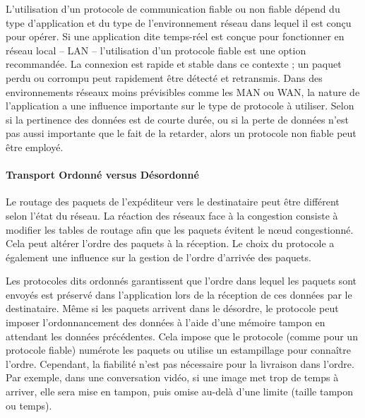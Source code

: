 L'utilisation d'un protocole de communication fiable ou non fiable dépend du 
type d'application et du type de l'environnement réseau dans lequel il est conçu 
pour opérer. Si une application dite temps-réel est conçue pour fonctionner en réseau 
local -- \gls{LAN} -- l'utilisation d'un protocole fiable est une option recommandée. 
La connexion est rapide et stable dans ce contexte ; un paquet 
perdu ou corrompu peut rapidement être détecté et retransmis. Dans des 
environnements réseaux moins prévisibles comme les \gls{MAN} ou 
\gls{WAN}, la nature de l'application a une influence importante sur le type de 
protocole à utiliser. Selon si la pertinence des données est de courte durée, ou si 
la perte de données n'est pas aussi importante que le fait de la retarder, alors un 
protocole non fiable peut être employé.


\paragraph{Transport Ordonné versus Désordonné}
\label{sec:ordre}
Le routage des paquets de l'expéditeur vers le destinataire peut être différent 
selon l'état du réseau. La réaction des réseaux face à la congestion consiste à 
modifier les tables de routage afin que les paquets évitent le n\oe ud congestionné. 
Cela peut altérer l'ordre des paquets à la réception. Le choix du protocole a 
également une influence sur la gestion de l'ordre d'arrivée des paquets.

Les protocoles dits \og ordonnés\fg{} garantissent que l'ordre dans lequel les 
paquets sont envoyés est préservé dans l'application lors de la réception de ces 
données par le destinataire. Même si les paquets arrivent dans le désordre, le 
protocole peut imposer l'ordonnancement des données à l'aide d'une mémoire 
tampon en attendant les données précédentes. Cela impose que le protocole 
(comme pour un protocole fiable) numérote les paquets ou utilise un estampillage 
pour connaître l'ordre. Cependant, la fiabilité n'est pas nécessaire pour la livraison 
dans l'ordre. Par exemple, dans une conversation vidéo, si une image met trop de 
temps à arriver, elle sera mise en tampon, puis omise au-delà d'une limite (taille 
tampon ou temps).

